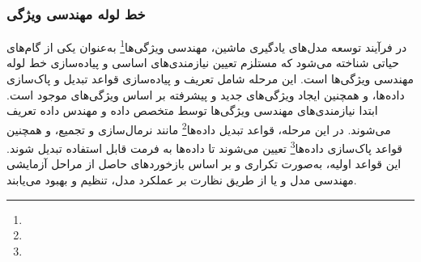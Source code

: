 \subsubsection{خط لوله مهندسی ویژگی}
در فرآیند توسعه مدل‌های یادگیری ماشین، مهندسی ویژگی‌ها\footnote{} به‌عنوان یکی از گام‌های حیاتی شناخته می‌شود که مستلزم تعیین نیازمندی‌های اساسی و پیاده‌سازی خط لوله مهندسی ویژگی‌ها است. این مرحله شامل تعریف و پیاده‌سازی قواعد تبدیل و پاک‌سازی داده‌ها، و همچنین ایجاد ویژگی‌های جدید و پیشرفته بر اساس ویژگی‌های موجود است. ابتدا نیازمندی‌های مهندسی ویژگی‌ها توسط متخصص داده و مهندس داده تعریف می‌شوند. در این مرحله، قواعد تبدیل داده‌ها\footnote{} مانند نرمال‌سازی و تجمیع، و همچنین قواعد پاک‌سازی داده‌ها\footnote{} تعیین می‌شوند تا داده‌ها به فرمت قابل استفاده تبدیل شوند. این قواعد اولیه، به‌صورت تکراری و بر اساس بازخوردهای حاصل از مراحل آزمایشی مهندسی مدل و یا از طریق نظارت بر عملکرد مدل، تنظیم و بهبود می‌یابند.

